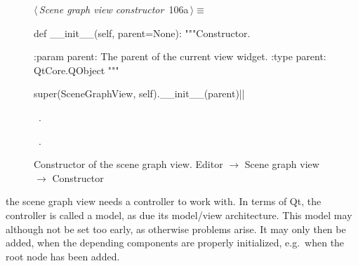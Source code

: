 \documentclass[%
    a4paper,    %
    justified,  %
    nobib,      %
    openany     %
]{tufte-book}
\makeatletter
\renewcommand{\label}[1]{\@tufte@label{##1}}%
\makeatother
\begin{document}
\begin{figure}[!htbp]
\begin{flushleft} \small
\begin{minipage}{\linewidth}\label{scrap40}\raggedright\small
{} $\langle\,${\itshape Scene graph view constructor}\nobreak\ {\footnotesize {106a}}$\,\rangle\equiv$
\vspace{-1ex}
\begin{pythoncode}
def __init__(self, parent=None):
    """Constructor.

    :param parent: The parent of the current view widget.
    :type parent:  QtCore.QObject
    """

    super(SceneGraphView, self).__init__(parent)|\NWsep|
\end{pythoncode}
\vspace{1.5ex}
\footnotesize
\begin{list}{}{\setlength{\itemsep}{-\parsep}\setlength{\itemindent}{-\leftmargin}}
\item \NWtxtMacroDefBy\ .
\item \NWtxtMacroRefIn\ .

\item{}
\end{list}
\end{minipage}\vspace{4ex}
\end{flushleft}
\caption{Constructor of the scene graph view.
  \newline{}\newline{}Editor $\rightarrow$ Scene graph view
  $\rightarrow$ Constructor}
\end{figure}

 the scene graph view needs a
controller to work with. In terms of Qt, the controller is called a model, as
due its model/view architecture. This model may although not be set too early,
as otherwise problems arise. It may only then be added, when the depending
components are properly initialized, e.g.\ when the root node has been added.
\end{document}
